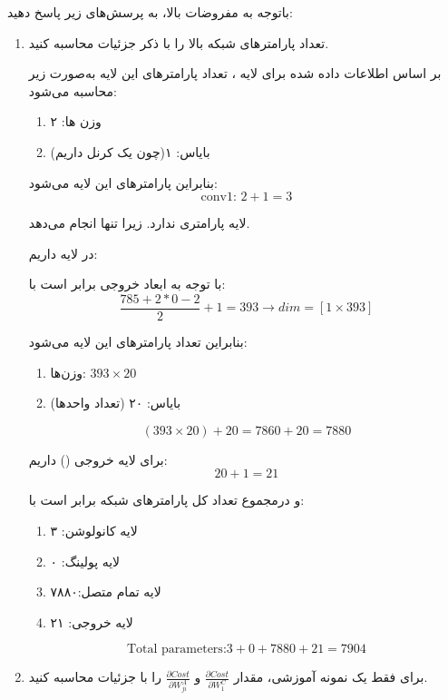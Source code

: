 باتوجه به مفروضات بالا، به پرسش‌های زیر پاسخ دهید:

\begin{enumerate}
	\item تعداد پارامتر‌های شبکه بالا را با ذکر جزئیات محاسبه کنید.
	
	\begin{qsolve}
		بر اساس اطلاعات داده شده برای لایه ، تعداد پارامترهای این لایه به‌صورت زیر محاسبه می‌شود:
		\begin{enumerate}
			\item وزن ها: ۲
			\item  بایاس: ۱(چون یک کرنل داریم)
		\end{enumerate}
		بنابراین پارامتر‌های این لایه می‌شود:
		$$ \text{conv1: }2+1=3 $$
		
		
		لایه  پارامتری ندارد. زیرا تنها  انجام می‌دهد.
		
		در لایه  داریم:
		
		با توجه به  ابعاد خروجی برابر است با:
		$$ \frac{785+2*0-2}{2}+1=393 \rightarrow dim= [1\times 393] $$
		
		بنابراین تعداد پارامترهای این لایه می‌شود:
		
		\begin{enumerate}
			\item وزن‌ها: $393\times 20$
			\item بایاس: ۲۰ (تعداد واحد‌ها)
		\end{enumerate}
		
		$$ (393\times 20) + 20 = 7860 + 20 = 7880$$
		
		
		
		برای لایه خروجی () داریم:
		$$ 20+1=21 $$
		
		و درمجموع تعداد کل پارامتر‌های شبکه برابر است با:
		
		\begin{enumerate}
			\item لایه کانولوشن: ۳
			\item لایه پولینگ: ۰
			\item لایه تمام متصل:‌۷۸۸۰
			\item لایه خروجی:‌ ۲۱
		\end{enumerate}
		
		$$ \text{Total parameters:} 3+0+7880+21=7904 $$
		
		
		
		
	\end{qsolve}
	
	
	
	
	
	
	
	
	
	
	
	
	
	
	
	\item برای فقط یک نمونه آموزشی، مقدار 
	$\frac{\partial Cost}{\partial W_1^C}$ و
	$\frac{\partial Cost}{\partial W_{ji}^A}$
	را با جزئیات محاسبه کنید.
\end{enumerate}





